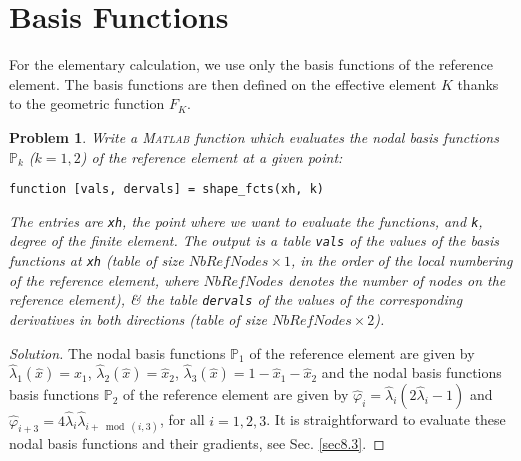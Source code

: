 \documentclass[11pt,a4paper,center,notitlepage]{article}
\numberwithin{equation}{section}
\newtheorem{prob}{Problem}[section]
\begin{document}
\section{Basis Functions}
For the elementary calculation, we use only the basis functions of the reference element. The basis functions are then defined on the effective element $K$ thanks to the geometric function $F_K$.
\begin{prob}
Write a \textsc{Matlab} function which evaluates the nodal basis functions $\mathbb{P}_k$ ($k=1,2$) of the reference element at a given point:
\begin{verbatim}
function [vals, dervals] = shape_fcts(xh, k)
\end{verbatim}
The entries are \verb|xh|, the point where we want to evaluate the functions, and \verb|k|, degree of the finite element. The output is a table \verb|vals| of the values of the basis functions at \verb|xh| (table of size $NbRefNodes \times 1$, in the order of the local numbering of the reference element, where $NbRefNodes$ denotes the number of nodes on the reference element), \& the table \verb|dervals| of the values of the corresponding derivatives in both directions (table of size $NbRefNodes \times 2$).
\end{prob}

\begin{proof}[Solution]
The nodal basis functions $\mathbb{P}_1$ of the reference element are given by ${\widehat \lambda _1}\left( {\widehat x} \right) = {\widehat x_1}$, ${\widehat \lambda _2}\left( {\widehat x} \right) = {\widehat x_2}$, ${\widehat \lambda _3}\left( {\widehat x} \right) = 1 - {\widehat x_1} - {\widehat x_2}$ and the nodal basis functions basis functions $\mathbb{P}_2$ of the reference element are given by ${\widehat \varphi _i} = {\widehat \lambda _i}\left( {2{{\widehat \lambda }_i} - 1} \right)$ and ${\widehat \varphi _{i + 3}} = 4{\widehat \lambda _i}{\widehat \lambda _{i + \bmod \left( {i,3} \right)}}$, for all $i = 1,2,3$. It is straightforward to evaluate these nodal basis functions and their gradients, see Sec. \ref{sec8.3}. 
\end{proof}
\end{document}

